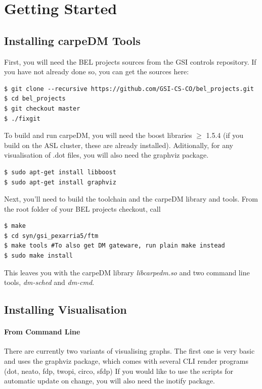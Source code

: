 \pagebreak

\section{Getting Started}

\subsection{Installing carpeDM Tools}
%
First, you will need the BEL projects sources from the GSI controls repository. If you have not already done so, you can get the sources here:
%
\begin{lstlisting}[style = customshell]
$ git clone --recursive https://github.com/GSI-CS-CO/bel_projects.git
$ cd bel_projects
$ git checkout master
$ ./fixgit
\end{lstlisting}
%
To build and run carpeDM, you will need the boost libraries $\ge$ 1.5.4 (if you build on the ASL cluster, these are already installed).
Aditionally, for any visualisation of .dot files, you will also need the graphviz package.

\begin{lstlisting}[style = customshell]
$ sudo apt-get install libboost
$ sudo apt-get install graphviz
\end{lstlisting}

Next, you'll need to build the toolchain and the carpeDM library and tools. From the root folder of your BEL projects checkout, call
%
\begin{lstlisting}[style = customshell]
$ make
$ cd syn/gsi_pexarria5/ftm
$ make tools #To also get DM gateware, run plain make instead
$ sudo make install
\end{lstlisting}
%
This leaves you with the carpeDM library \emph{libcarpedm.so} and two command line tools, \emph{dm-sched} and \emph{dm-cmd}.

\subsection{Installing Visualisation}

\paragraph{From Command Line}
There are currently two variants of visualising graphs. The first one is very basic and uses the graphviz package, which comes with several CLI render programs (dot, neato, fdp, twopi, circo, sfdp)
If you would like to use the scripts for automatic update on change, you will also need the inotify package.

